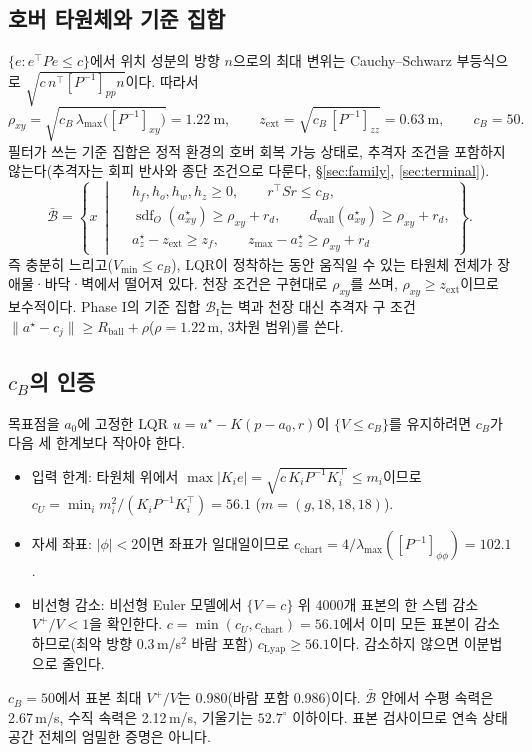 \documentclass[10pt,a4paper]{article}
\newcommand{\sdf}{\operatorname{sdf}}
\newcommand{\Base}{\bar{\mathcal{B}}}
\newcommand{\BaseP}{\mathcal{B}_{\mathrm{I}}}
\newcommand{\ustar}{u^{\star}}
\begin{document}
\subsection{호버 타원체와 기준 집합}
$\{e:e^\top Pe\le c\}$에서 위치 성분의 방향 $n$으로의 최대 변위는 Cauchy--Schwarz 부등식으로 $\sqrt{c\,n^\top[P^{-1}]_{pp}n}$이다. 따라서
\begin{equation}
\rho_{xy}=\sqrt{c_B\,\lambda_{\max}\big([P^{-1}]_{xy}\big)}=1.22\ \mathrm m,\qquad
z_{\mathrm{ext}}=\sqrt{c_B\,[P^{-1}]_{zz}}=0.63\ \mathrm m,\qquad c_B=50 .
\label{eq:extent}
\end{equation}
필터가 쓰는 기준 집합은 정적 환경의 호버 회복 가능 상태로, 추격자 조건을 포함하지 않는다(추격자는 회피 반사와 종단 조건으로 다룬다, \S\ref{sec:family}, \ref{sec:terminal}).
\begin{equation}
\Base=\left\{x\ \middle|\
\begin{aligned}
&h_f,h_o,h_w,h_z\ge0,\qquad r^\top Sr\le c_B,\\
&\sdf_O(a^\star_{xy})\ge\rho_{xy}+r_d,\qquad d_{\mathrm{wall}}(a^\star_{xy})\ge\rho_{xy}+r_d,\\
&a^\star_z-z_{\mathrm{ext}}\ge z_f,\qquad z_{\max}-a^\star_z\ge\rho_{xy}+r_d
\end{aligned}\right\}.
\label{eq:base}
\end{equation}
즉 충분히 느리고($V_{\min}\le c_B$), LQR이 정착하는 동안 움직일 수 있는 타원체 전체가 장애물·바닥·벽에서 떨어져 있다.
천장 조건은 구현대로 $\rho_{xy}$를 쓰며, $\rho_{xy}\ge z_{\mathrm{ext}}$이므로 보수적이다.
Phase I의 기준 집합 $\BaseP$는 벽과 천장 대신 추격자 구 조건 $\|a^\star-c_j\|\ge R_{\mathrm{ball}}+\rho$($\rho=1.22$\,m, 3차원 범위)를 쓴다.

\subsection{$c_B$의 인증}
목표점을 $a_0$에 고정한 LQR $u=\ustar-K(p-a_0,r)$이 $\{V\le c_B\}$를 유지하려면 $c_B$가 다음 세 한계보다 작아야 한다.
\begin{itemize}
\item 입력 한계: 타원체 위에서 $\max|K_ie|=\sqrt{c\,K_iP^{-1}K_i^\top}\le m_i$이므로 $c_U=\min_i m_i^2/(K_iP^{-1}K_i^\top)=56.1$ ($m=(g,18,18,18)$).
\item 자세 좌표: $|\phi|<2$이면 좌표가 일대일이므로 $c_{\mathrm{chart}}=4/\lambda_{\max}([P^{-1}]_{\phi\phi})=102.1$.
\item 비선형 감소: 비선형 Euler 모델에서 $\{V=c\}$ 위 4000개 표본의 한 스텝 감소 $V^+/V<1$을 확인한다. $c=\min(c_U,c_{\mathrm{chart}})=56.1$에서 이미 모든 표본이 감소하므로(최악 방향 0.3\,m/s$^2$ 바람 포함) $c_{\mathrm{Lyap}}\ge56.1$이다. 감소하지 않으면 이분법으로 줄인다.
\end{itemize}
$c_B=50$에서 표본 최대 $V^+/V$는 0.980(바람 포함 0.986)이다. $\Base$ 안에서 수평 속력은 2.67\,m/s, 수직 속력은 2.12\,m/s, 기울기는 $52.7^\circ$ 이하이다.
표본 검사이므로 연속 상태공간 전체의 엄밀한 증명은 아니다.
\end{document}
